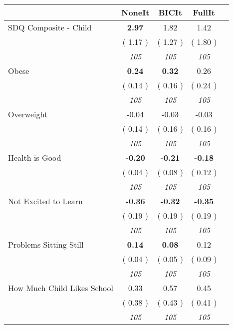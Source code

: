 \begin{tabular}{l c c c c}
\toprule
 & NoneIt & BICIt & FullIt \\
\midrule
SDQ Composite - Child & \textbf{      2.97 } &      1.82 &      1.42 \\
& (     1.17 ) & (     1.27 ) & (     1.80 ) \\
& \textit{ 105 } & \textit{ 105 } & \textit{ 105 } \\
Obese & \textbf{      0.24 } & \textbf{      0.32 } &      0.26 \\
& (     0.14 ) & (     0.16 ) & (     0.24 ) \\
& \textit{ 105 } & \textit{ 105 } & \textit{ 105 } \\
Overweight &     -0.04 &     -0.03 &     -0.03 \\
& (     0.14 ) & (     0.16 ) & (     0.16 ) \\
& \textit{ 105 } & \textit{ 105 } & \textit{ 105 } \\
Health is Good & \textbf{     -0.20 } & \textbf{     -0.21 } & \textbf{     -0.18 } \\
& (     0.04 ) & (     0.08 ) & (     0.12 ) \\
& \textit{ 105 } & \textit{ 105 } & \textit{ 105 } \\
Not Excited to Learn & \textbf{     -0.36 } & \textbf{     -0.32 } & \textbf{     -0.35 } \\
& (     0.19 ) & (     0.19 ) & (     0.19 ) \\
& \textit{ 105 } & \textit{ 105 } & \textit{ 105 } \\
Problems Sitting Still & \textbf{      0.14 } & \textbf{      0.08 } &      0.12 \\
& (     0.04 ) & (     0.05 ) & (     0.09 ) \\
& \textit{ 105 } & \textit{ 105 } & \textit{ 105 } \\
How Much Child Likes School &      0.33 &      0.57 &      0.45 \\
& (     0.38 ) & (     0.43 ) & (     0.41 ) \\
& \textit{ 105 } & \textit{ 105 } & \textit{ 105 } \\
\bottomrule
\end{tabular}
